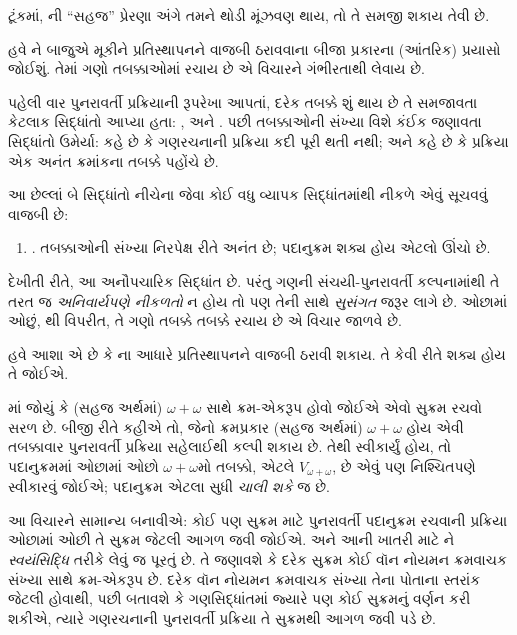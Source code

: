 ટૂંકમાં, \limofsize{}ની ``સહજ'' પ્રેરણા અંગે તમને
થોડી મૂંઝવણ થાય, તો તે સમજી શકાય તેવી છે.
\endgroup

\begingroup
\makeatletter{}\makeatother

\label{guunit:OLP-0570}


હવે \limofsize{}ને બાજુએ મૂકીને પ્રતિસ્થાપનને વાજબી
ઠરાવવાના બીજા પ્રકારના (આંતરિક) પ્રયાસો જોઈશું. તેમાં
ગણો તબક્કાઓમાં રચાય છે એ વિચારને ગંભીરતાથી લેવાય છે.

પહેલી વાર પુનરાવર્તી પ્રક્રિયાની રૂપરેખા આપતાં, દરેક
તબક્કે શું થાય છે તે સમજાવતા કેટલાક સિદ્ધાંતો આપ્યા
હતા: \stageshier, \stagesord અને \stagesacc. પછી
તબક્કાઓની સંખ્યા વિશે કંઈક જણાવતા સિદ્ધાંતો ઉમેર્યા:
\stagessucc{} કહે છે કે ગણરચનાની પ્રક્રિયા કદી પૂરી
થતી નથી; અને \stagesinf{} કહે છે કે પ્રક્રિયા એક
અનંત ક્રમાંકના તબક્કે પહોંચે છે.

આ છેલ્લાં બે સિદ્ધાંતો નીચેના જેવા કોઈ વધુ વ્યાપક
સિદ્ધાંતમાંથી નીકળે એવું સૂચવવું વાજબી છે:
\begin{enumerate}
	\item[] \stagesinex. તબક્કાઓની સંખ્યા નિરપેક્ષ રીતે
	અનંત છે; પદાનુક્રમ શક્ય હોય એટલો ઊંચો છે.
\end{enumerate}
દેખીતી રીતે, આ અનૌપચારિક સિદ્ધાંત છે. પરંતુ ગણની
સંચયી-પુનરાવર્તી કલ્પનામાંથી તે તરત જ \emph{અનિવાર્યપણે
નીકળતો} ન હોય તો પણ તેની સાથે \emph{સુસંગત} જરૂર
લાગે છે. ઓછામાં ઓછું, \limofsize{}થી વિપરીત, તે
ગણો તબક્કે તબક્કે રચાય છે એ વિચાર જાળવે છે.

હવે આશા એ છે કે \stagesinex{}ના આધારે પ્રતિસ્થાપનને
વાજબી ઠરાવી શકાય. તે કેવી રીતે શક્ય હોય તે જોઈએ.

માં જોયું કે (સહજ અર્થમાં)
$\omega+\omega$ સાથે ક્રમ-એકરૂપ હોવો જોઈએ એવો સુક્રમ
રચવો સરળ છે. બીજી રીતે કહીએ તો, જેનો ક્રમપ્રકાર
(સહજ અર્થમાં) $\omega+\omega$ હોય એવી તબક્કાવાર
પુનરાવર્તી પ્રક્રિયા સહેલાઈથી કલ્પી શકાય છે. તેથી
\stagesinex{} સ્વીકાર્યું હોય, તો પદાનુક્રમમાં ઓછામાં
ઓછો $\omega+\omega$મો તબક્કો, એટલે
$V_{\omega+\omega}$, છે એવું પણ નિશ્ચિતપણે સ્વીકારવું
જોઈએ; પદાનુક્રમ એટલા સુધી \emph{ચાલી શકે} જ છે.

આ વિચારને સામાન્ય બનાવીએ: કોઈ પણ સુક્રમ માટે
પુનરાવર્તી પદાનુક્રમ રચવાની પ્રક્રિયા ઓછામાં ઓછી તે
સુક્રમ જેટલી આગળ જવી જોઈએ. અને આની ખાતરી માટે
ને
\emph{સ્વયંસિદ્ધિ} તરીકે લેવું જ પૂરતું છે. તે જણાવશે
કે દરેક સુક્રમ કોઈ વૉન નોયમન ક્રમવાચક સંખ્યા સાથે
ક્રમ-એકરૂપ છે. દરેક વૉન નોયમન ક્રમવાચક સંખ્યા તેના
પોતાના સ્તરાંક જેટલી હોવાથી,
પછી બતાવશે કે ગણસિદ્ધાંતમાં જ્યારે પણ કોઈ સુક્રમનું
વર્ણન કરી શકીએ, ત્યારે ગણરચનાની પુનરાવર્તી પ્રક્રિયા
તે સુક્રમથી આગળ જવી પડે છે.

